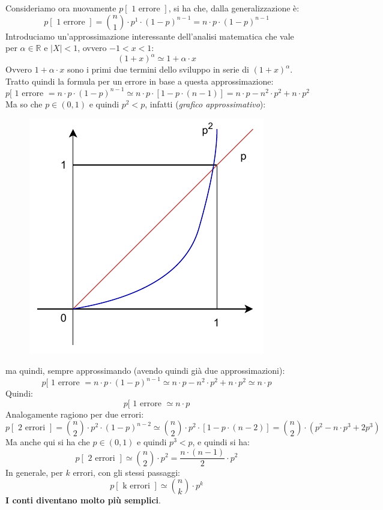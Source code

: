 \documentclass[a4paper,12pt, oneside]{book}
\begin{document}
Consideriamo ora nuovamente $p[\mbox{ 1 errore }]$, si ha che, dalla
generalizzazione è:
\[p[\mbox{ 1 errore }]={{n}\choose{1}}\cdot p^1\cdot(1-p)^{n-1}=n\cdot p\cdot
  (1-p)^{n-1}\]
Introduciamo un'approssimazione interessante dell'analisi matematica che vale
per $\alpha\in \mathbb{R}$ e $|X|<1$, ovvero $-1<x<1$:
\[(1+x)^\alpha\simeq 1+\alpha\cdot x\]
Ovvero $1+\alpha\cdot x$ sono i primi due termini dello sviluppo in serie di
$(1+x)^\alpha$.\\
Tratto quindi la formula per un errore in base a questa approssimazione:
\[p[\mbox{ 1 errore }=n\cdot p\cdot(1-p)^{n-1}\simeq n\cdot p\cdot
  [1-p\cdot(n-1)]=n\cdot p-n^2\cdot p^2+n\cdot p^2\]
Ma so che $p\in(0,1)$ e quindi $p^2<p$, infatti (\textit{grafico
  approssimativo}): 
\begin{figure}[H]
  \centering
  \includegraphics[scale = 0.8]{img/p.pdf}
\end{figure}
ma quindi, sempre approssimando (avendo quindi già due approssimazioni):
\[p[\mbox{ 1 errore }=n\cdot p\cdot(1-p)^{n-1}\simeq n\cdot p-n^2\cdot
  p^2+n\cdot p^2\simeq n\cdot p\]
Quindi:
\[p[\mbox{ 1 errore }\simeq n\cdot p\]
Analogamente ragiono per due errori:
\[p[\mbox{ 2 errori }]={{n}\choose{2}}\cdot
  p^2\cdot(1-p)^{n-2}\simeq{{n}\choose{2}}\cdot
  p^2\cdot[1-p\cdot(n-2)]={{n}\choose{2}}\cdot (p^2-n\cdot p^3+2p^3)\]
Ma anche qui si ha che $p\in(0,1)$ e quindi $p^3<p$, e quindi si ha:
\[p[\mbox{ 2 errori }]\simeq{{n}\choose{2}}\cdot p^2=\frac{n\cdot
    (n-1)}{2}\cdot p^2\]
In generale, per $k$ errori, con gli stessi passaggi:
\[p[\mbox{ k errori }]\simeq{{n}\choose{k}}\cdot p^k\]
\textbf{I conti diventano molto più semplici}.\\
\end{document}
